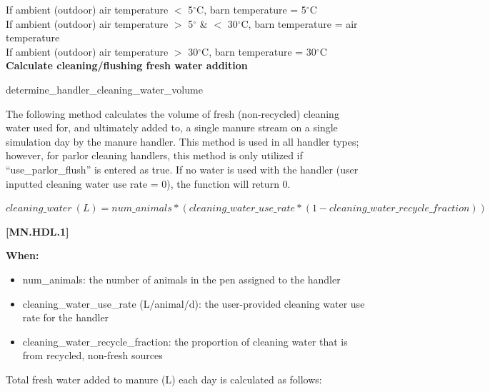\begin{refsection}
\vspace{ 0.25cm}
If ambient (outdoor) air temperature \(<\) 5$^\circ$C, barn temperature = 5$^\circ$C\\
If ambient (outdoor) air temperature \(>\) 5$^\circ$ \& \(<\) 30$^\circ$C, barn temperature = air temperature\\
If ambient (outdoor) air temperature \(>\) 30$^\circ$C, barn temperature = 30$^\circ$C\\


\textbf{Calculate cleaning/flushing fresh water addition}
\vspace{ 0.25cm}

determine\_handler\_cleaning\_water\_volume

The following method calculates the volume of fresh (non-recycled) cleaning water used for, and ultimately added to, a single manure stream on a single simulation day by the manure handler. This method is used in all handler types; however, for parlor cleaning handlers, this method is only utilized if “use\_parlor\_flush” is entered as true. If no water is used with the handler (user inputted cleaning water use rate = 0), the function will return 0.
\vspace{0.2cm}

    \begin{center}
        \(cleaning\_water \ (L) = num\_animals * (cleaning\_water\_use\_rate * (1 - cleaning\_water\_recycle\_fraction)) \)
    \end{center}
        \vspace{0.5cm}
    
            {\raggedleft \textbf{[MN.HDL.1]}\par}
            \vspace{0.5cm}

\textbf{When:}
    \begin{itemize}
        \item num\_animals: the number of animals in the pen assigned to the handler
        \item cleaning\_water\_use\_rate (L/animal/d): the user-provided cleaning water use rate for the handler
        \item cleaning\_water\_recycle\_fraction: the proportion of cleaning water that is from recycled, non-fresh sources

    \end{itemize}  
    \vspace{0.2cm}
    
Total fresh water added to manure (L) each day is calculated as follows: 
\vspace{0.2cm}


\end{refsection}
